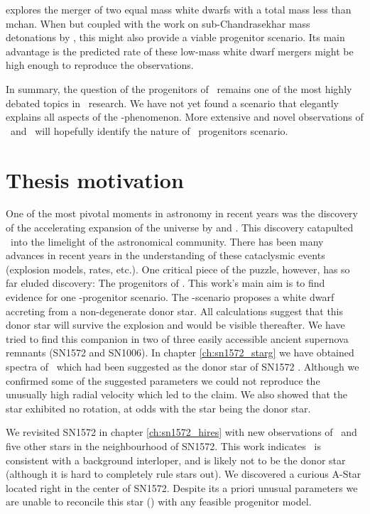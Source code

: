 \citet{2010ApJ...722L.157V} explores the merger of two equal mass white dwarfs with a total mass less than \gls{mchan}. When but coupled with the work on sub-Chandrasekhar mass detonations by \citet{2010ApJ...714L..52S}, this might also provide a viable progenitor scenario. Its main advantage is the predicted rate of these low-mass white dwarf mergers might be high enough to reproduce the observations. 

In summary, the question of the progenitors of \sneia\ remains one of the most highly debated topics in \sneia\ research. We have not yet found a scenario that elegantly explains all aspects of the \snia-phenomenon. More extensive and novel observations of \sneia\ and \snr\ will hopefully identify the nature of \snia\ progenitors scenario.



\section{Thesis motivation}
One of the most pivotal moments in astronomy in recent years was the discovery of the accelerating expansion of the universe by \citet{1998AJ....116.1009R} and \citet{1999ApJ...517..565P}. This discovery catapulted \sneia\ into the limelight of the astronomical community. There has been many advances in recent years in the understanding of these cataclysmic events (explosion models, rates, etc.). One critical piece of the puzzle, however, has so far eluded discovery: The progenitors of \sneia. This work's main aim is to find evidence for one \snia-progenitor scenario. The \sd-scenario proposes a white dwarf accreting from a non-degenerate donor star. All calculations suggest that this donor star will survive the explosion and would be visible thereafter. We have tried to find this companion in two of three easily accessible ancient supernova remnants (SN1572 and SN1006). In chapter \ref{ch:sn1572_starg} we have obtained spectra of \starg\ which had been suggested as the donor star of SN1572 \citep{2004Natur.431.1069R}. Although we confirmed some of the suggested parameters we could not reproduce the unusually high radial velocity which led to the claim.  We also showed that the star exhibited no rotation, at odds with the star being the donor star.

We revisited SN1572 in chapter \ref{ch:sn1572_hires} with new observations of \starg\ and five other stars in the neighbourhood of SN1572. This work indicates \starg\ is consistent with a background interloper, and is likely not to be the donor star (although it is hard to completely rule stars out). We discovered a curious A-Star located right in the center of SN1572. Despite its a priori unusual parameters we are unable to reconcile this star (\starb) with any feasible progenitor model. 

